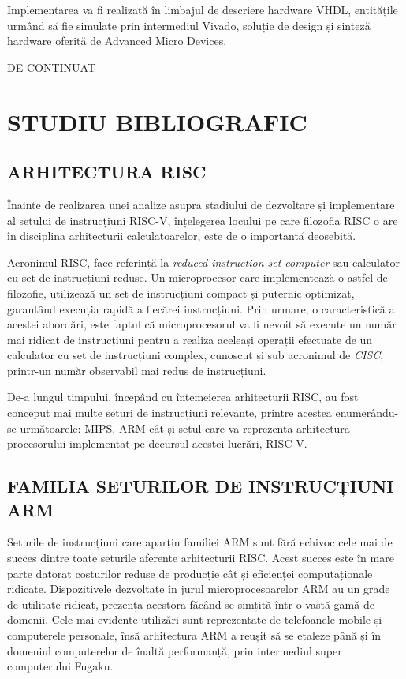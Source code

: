 \documentclass[12pt]{article}
\begin{document}
Implementarea va fi realizată în limbajul de descriere hardware VHDL, entitățile urmând să fie simulate prin intermediul Vivado, soluție de design și sinteză hardware oferită de Advanced Micro Devices.

\begin{center}
\vspace*{40mm}
DE CONTINUAT
\end{center}

\newpage
\section{\centering STUDIU BIBLIOGRAFIC}
\bigbreak
\subsection{ARHITECTURA RISC}
Înainte de realizarea unei analize asupra stadiului de dezvoltare și implementare al setului de instrucțiuni RISC-V, înțelegerea locului pe care filozofia RISC o are în disciplina arhitecturii calculatoarelor, este de o importantă deosebită.

Acronimul RISC, face referință la \textit{reduced instruction set computer} sau calculator cu set de instrucțiuni reduse. Un microprocesor care implementează o astfel de filozofie, utilizează un set de instrucțiuni compact și puternic optimizat, garantând execuția rapidă a fiecărei instrucțiuni. Prin urmare, o caracteristică a acestei abordări, este faptul că microprocesorul va fi nevoit să execute un număr mai ridicat de instrucțiuni pentru a realiza aceleași operații efectuate de un calculator cu set de instrucțiuni complex, cunoscut și sub acronimul de \textit{CISC}, printr-un număr observabil mai redus de instrucțiuni.

De-a lungul timpului, începând cu întemeierea arhitecturii RISC, au fost conceput mai multe seturi de instrucțiuni relevante, printre acestea enumerându-se următoarele: MIPS, ARM cât și setul care va reprezenta arhitectura procesorului implementat pe decursul acestei lucrări, RISC-V.

\subsection{FAMILIA SETURILOR DE INSTRUCȚIUNI ARM}
Seturile de instrucțiuni care aparțin familiei ARM sunt fără echivoc cele mai de succes dintre toate seturile aferente arhitecturii RISC. Acest succes este în mare parte datorat costurilor reduse de producție cât și eficienței computaționale ridicate. Dispozitivele dezvoltate în jurul microprocesoarelor ARM au un grade de utilitate ridicat, prezența acestora făcând-se simțită într-o vastă gamă de domenii. Cele mai evidente utilizări sunt reprezentate de telefoanele mobile și computerele personale, însă arhitectura ARM a reușit să se etaleze până și în domeniul computerelor de înaltă performanță, prin intermediul super computerului Fugaku.
\end{document}
